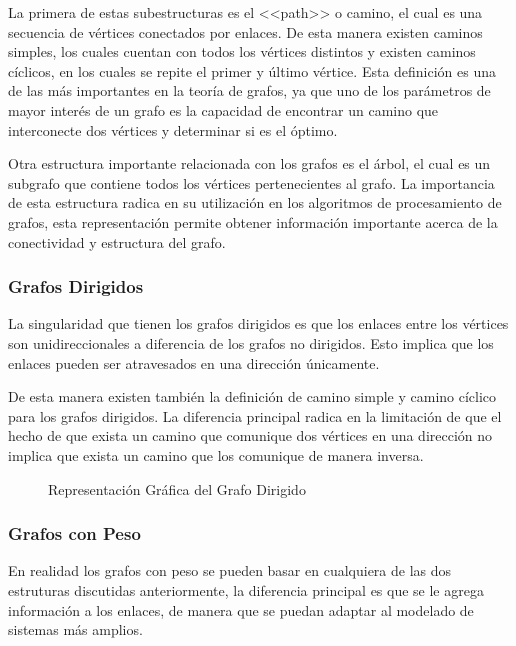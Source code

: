 \documentclass[a4paper, 11pt]{report}
\newcommand{\DrawGraph}[5]{

    \begin{scope}[#4]
    \foreach \pos/\nodo in {{(0,0)/1}, {(2,1)/2}, {(4,1)/3}, {(0,2)/4}, {(3,0)/5}, {(2,-1)/6}, {(4,-1)/7}}
        \node[vertex] (#3\nodo) at \pos {\nodo};

    \foreach \start/\end in {1/4, 1/2, 1/6,2/5,2/3,2/6,5/7,3/7,4/2,6/7}
        \path[edge,#5] (#3\start) -- (#3\end);

    \foreach \nodo in {#1}
        \node[selected vertex] at (#3\nodo) {\nodo};
        

    \begin{pgfonlayer}{background}
        \foreach \start/\end in {#2}
            \path[rojod edge,#5] (#3\start) -- (#3\end);
    \end{pgfonlayer}
    \end{scope}
}
\newcommand{\Deactivate}{\shorthandoff{<>."}}
\newcommand{\Activate}{\shorthandon{<>."}}
\begin{document}
La primera de estas subestructuras es el <<path>> o camino, el cual es una secuencia de v\'ertices conectados por enlaces. De esta manera existen caminos simples, los cuales cuentan con todos los v\'ertices distintos y existen caminos c\'iclicos, en los cuales se repite el primer y \'ultimo v\'ertice. Esta definici\'on es una de las m\'as importantes en la teor\'ia de grafos, ya que uno de los par\'ametros de mayor inter\'es de un grafo es la capacidad de encontrar un camino que interconecte dos v\'ertices y determinar si es el \'optimo.

Otra estructura importante relacionada con los grafos es el \'arbol, el cual es un subgrafo que contiene todos los v\'ertices pertenecientes al grafo. La importancia de esta estructura radica en su utilizaci\'on en los algoritmos de procesamiento de grafos, esta representaci\'on permite obtener informaci\'on importante acerca de la conectividad y estructura del grafo.

\subsubsection{Grafos Dirigidos}
La singularidad que tienen los grafos dirigidos es que los enlaces entre los v\'ertices son unidireccionales a diferencia de los grafos no dirigidos. Esto implica que los enlaces pueden ser atravesados en una direcci\'on \'unicamente.

De esta manera existen tambi\'en la definici\'on de camino simple y camino c\'iclico para los grafos dirigidos. La diferencia principal radica en la limitaci\'on de que el hecho de que exista un camino que comunique dos v\'ertices en una direcci\'on no implica que exista un camino que los comunique de manera inversa.

\begin{figure}[!h]
    \centering
    \Deactivate
    \Activate
    \caption{Representaci\'on Gr\'afica del Grafo Dirigido}
    \label{EjGrafoDirigido}
\end{figure}

\subsubsection{Grafos con Peso}
En realidad los grafos con peso se pueden basar en cualquiera de las dos estruturas discutidas anteriormente, la diferencia principal es que se le agrega informaci\'on a los enlaces, de manera que se puedan adaptar al modelado de sistemas m\'as amplios.
\end{document}
